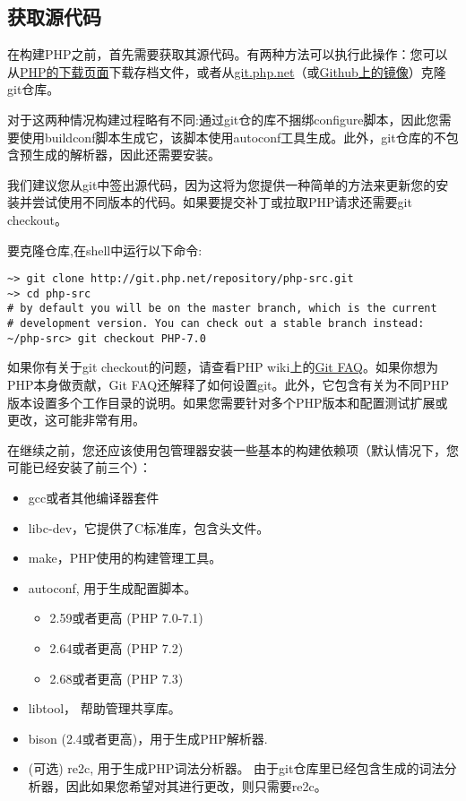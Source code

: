 \subsection{获取源代码}

在构建PHP之前，首先需要获取其源代码。有两种方法可以执行此操作：您可以从\href{http://www.php.net/downloads.php}{PHP的下载页面}下载存档文件，或者从\href{http://git.php.net/}{git.php.net}（或\href{http://www.github.com/php/php-src}{Github上的镜像}）克隆git仓库。

对于这两种情况构建过程略有不同:通过git仓的库不捆绑configure脚本，因此您需要使用buildconf脚本生成它，该脚本使用autoconf工具生成。此外，git仓库的不包含预生成的解析器，因此还需要安装。

我们建议您从git中签出源代码，因为这将为您提供一种简单的方法来更新您的安装并尝试使用不同版本的代码。如果要提交补丁或拉取PHP请求还需要git checkout。

要克隆仓库,在shell中运行以下命令:

\begin{lstlisting}[language=shell]
~> git clone http://git.php.net/repository/php-src.git
~> cd php-src
# by default you will be on the master branch, which is the current
# development version. You can check out a stable branch instead:
~/php-src> git checkout PHP-7.0
\end{lstlisting}

如果你有关于git checkout的问题，请查看PHP wiki上的\href{https://wiki.php.net/vcs/gitfaq}{Git FAQ}。如果你想为PHP本身做贡献，Git FAQ还解释了如何设置git。此外，它包含有关为不同PHP版本设置多个工作目录的说明。如果您需要针对多个PHP版本和配置测试扩展或更改，这可能非常有用。

在继续之前，您还应该使用包管理器安装一些基本的构建依赖项（默认情况下，您可能已经安装了前三个）：

\begin{itemize}
    \item gcc或者其他编译器套件
    \item libc-dev，它提供了C标准库，包含头文件。
    \item make，PHP使用的构建管理工具。
    \item autoconf, 用于生成配置脚本。
    \begin{itemize}
        \item 2.59或者更高 (PHP 7.0-7.1)
        \item 2.64或者更高 (PHP 7.2)
        \item 2.68或者更高 (PHP 7.3)
    \end{itemize}
    \item libtool， 帮助管理共享库。
    \item bison (2.4或者更高)，用于生成PHP解析器.
    \item (可选) re2c, 用于生成PHP词法分析器。 由于git仓库里已经包含生成的词法分析器，因此如果您希望对其进行更改，则只需要re2c。
\end{itemize}

